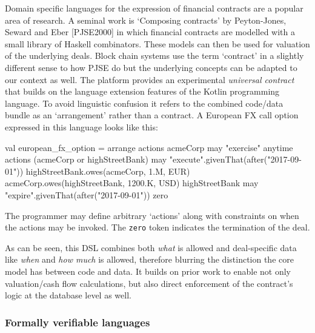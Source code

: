\documentclass{article}
\begin{document}
Domain specific languages for the expression of financial contracts are a popular area of research. A seminal work
is `Composing contracts' by Peyton-Jones, Seward and Eber [PJSE2000\cite{PeytonJones:2000:CCA:357766.351267}] in
which financial contracts are modelled with a small library of Haskell combinators. These models can then be used
for valuation of the underlying deals. Block chain systems use the term `contract' in a slightly different sense to
how PJSE do but the underlying concepts can be adapted to our context as well. The platform provides an
experimental \emph{universal contract} that builds on the language extension features of the Kotlin programming
language. To avoid linguistic confusion it refers to the combined code/data bundle as an `arrangement' rather than
a contract. A European FX call option expressed in this language looks like this:

\begin{kotlincode}
    val european_fx_option = arrange {
        actions {
            acmeCorp may {
                "exercise" anytime {
                    actions {
                        (acmeCorp or highStreetBank) may {
                            "execute".givenThat(after("2017-09-01")) {
                                highStreetBank.owes(acmeCorp, 1.M, EUR)
                                acmeCorp.owes(highStreetBank, 1200.K, USD)
                            }
                        }
                    }
                }
            }
            highStreetBank may {
                "expire".givenThat(after("2017-09-01")) {
                    zero
                }
            }
        }
    }
\end{kotlincode}

The programmer may define arbitrary `actions' along with constraints on when the actions may be invoked. The
\texttt{zero} token indicates the termination of the deal.

As can be seen, this DSL combines both \emph{what} is allowed and deal-specific data like \emph{when} and \emph{how
much} is allowed, therefore blurring the distinction the core model has between code and data. It builds on prior
work to enable not only valuation/cash flow calculations, but also direct enforcement of the contract's logic at
the database level as well.

\subsubsection{Formally verifiable languages}
\end{document}
